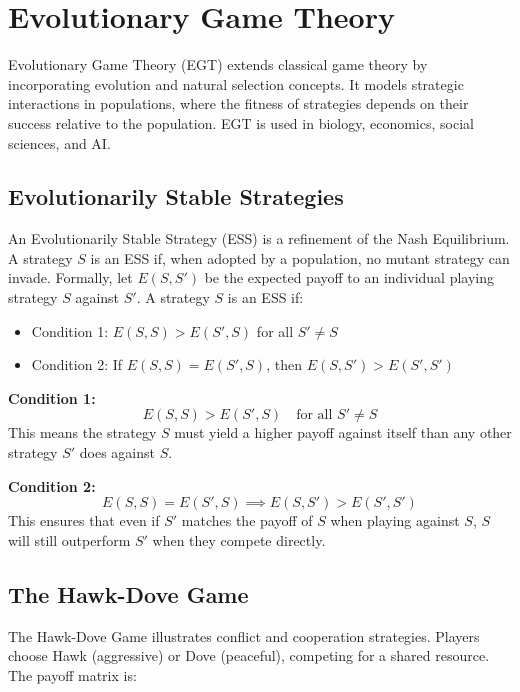 \documentclass[12pt]{book} %
\begin{document}
\FloatBarrier

\section{Evolutionary Game Theory}

Evolutionary Game Theory (EGT) extends classical game theory by incorporating evolution and natural selection concepts. It models strategic interactions in populations, where the fitness of strategies depends on their success relative to the population. EGT is used in biology, economics, social sciences, and AI.

\subsection{Evolutionarily Stable Strategies}

An Evolutionarily Stable Strategy (ESS) is a refinement of the Nash Equilibrium. A strategy \( S \) is an ESS if, when adopted by a population, no mutant strategy can invade. Formally, let \( E(S, S') \) be the expected payoff to an individual playing strategy \( S \) against \( S' \). A strategy \( S \) is an ESS if:

\begin{itemize}
    \item Condition 1: \( E(S, S) > E(S', S) \) for all \( S' \neq S \)
    \item Condition 2: If \( E(S, S) = E(S', S) \), then \( E(S, S') > E(S', S') \)
\end{itemize}

\textbf{Condition 1:}
\[
E(S, S) > E(S', S) \quad \text{for all } S' \neq S
\]
This means the strategy \( S \) must yield a higher payoff against itself than any other strategy \( S' \) does against \( S \).

\textbf{Condition 2:}
\[
E(S, S) = E(S', S) \implies E(S, S') > E(S', S')
\]
This ensures that even if \( S' \) matches the payoff of \( S \) when playing against \( S \), \( S \) will still outperform \( S' \) when they compete directly.

\subsection{The Hawk-Dove Game}

The Hawk-Dove Game illustrates conflict and cooperation strategies. Players choose Hawk (aggressive) or Dove (peaceful), competing for a shared resource. The payoff matrix is:
\end{document}
